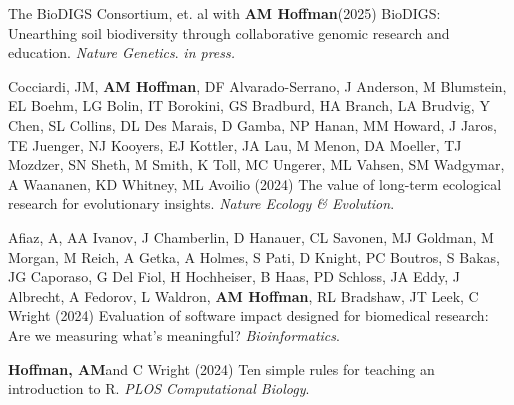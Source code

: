 \documentclass{cv}
\begin{document}
\begin{pubenum}




\item The BioDIGS Consortium, et. al with \textbf{AM Hoffman}\footnotemark[1] (2025) BioDIGS: Unearthing soil biodiversity through collaborative genomic research and education. \textit{Nature Genetics}. \textit{in press.}


\item Cocciardi, JM, \textbf{AM Hoffman}, DF Alvarado-Serrano, J Anderson, M Blumstein, EL Boehm, LG Bolin, IT Borokini, GS Bradburd, HA Branch, LA Brudvig, Y Chen, SL Collins, DL Des Marais, D Gamba, NP Hanan, MM Howard, J Jaros, TE Juenger, NJ Kooyers, EJ Kottler, JA Lau, M Menon, DA Moeller, TJ Mozdzer, SN Sheth, M Smith, K Toll, MC Ungerer, ML Vahsen, SM Wadgymar, A Waananen, KD Whitney, ML Avoilio (2024) The value of long-term ecological research for evolutionary insights. \textit{Nature Ecology \& Evolution}. 

\item Afiaz, A, AA Ivanov, J Chamberlin, D Hanauer, CL Savonen, MJ Goldman, M Morgan, M Reich, A Getka, A Holmes, S Pati, D Knight, PC Boutros, S Bakas, JG Caporaso, G Del Fiol, H Hochheiser, B Haas, PD Schloss, JA Eddy, J Albrecht, A Fedorov, L Waldron, \textbf{AM Hoffman}, RL Bradshaw, JT Leek, C Wright (2024) Evaluation of software impact designed for biomedical research: Are we measuring what's meaningful? \textit{Bioinformatics}. 

\item\textbf{Hoffman, AM}\footnotemark[1] and C Wright (2024) Ten simple rules for teaching an introduction to R. \textit{PLOS Computational Biology}. 


\end{pubenum}
\end{document}
